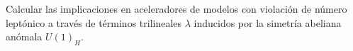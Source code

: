 \begin{ideas}


 Calcular las implicaciones en aceleradores de modelos con violación 
de número leptónico a través de términos trilineales $\lambda$ inducidos por la simetría 
abeliana anómala $U(1)_H$.
\end{ideas}



